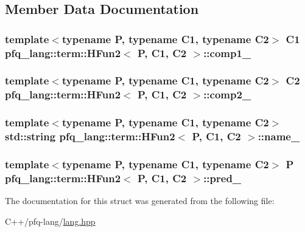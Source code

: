 \subsection{Member Data Documentation}
\hypertarget{structpfq__lang_1_1term_1_1HFun2_a7c395ee57e98d0991b54984ed3da65a8}{
\subsubsection[{comp1\-\_\-}]{\setlength{\rightskip}{0pt plus 5cm}template$<$typename P, typename C1, typename C2$>$ C1 {\bf pfq\-\_\-lang\-::term\-::\-H\-Fun2}$<$ P, C1, C2 $>$\-::comp1\-\_\-}}\label{structpfq__lang_1_1term_1_1HFun2_a7c395ee57e98d0991b54984ed3da65a8}
\hypertarget{structpfq__lang_1_1term_1_1HFun2_a9d891e5539b5140e3ba2c4a02c9ac1fb}{
\subsubsection[{comp2\-\_\-}]{\setlength{\rightskip}{0pt plus 5cm}template$<$typename P, typename C1, typename C2$>$ C2 {\bf pfq\-\_\-lang\-::term\-::\-H\-Fun2}$<$ P, C1, C2 $>$\-::comp2\-\_\-}}\label{structpfq__lang_1_1term_1_1HFun2_a9d891e5539b5140e3ba2c4a02c9ac1fb}
\hypertarget{structpfq__lang_1_1term_1_1HFun2_aa3808dccb93ad00cfd0be7caa80f30b9}{
\subsubsection[{name\-\_\-}]{\setlength{\rightskip}{0pt plus 5cm}template$<$typename P, typename C1, typename C2$>$ std\-::string {\bf pfq\-\_\-lang\-::term\-::\-H\-Fun2}$<$ P, C1, C2 $>$\-::name\-\_\-}}\label{structpfq__lang_1_1term_1_1HFun2_aa3808dccb93ad00cfd0be7caa80f30b9}
\hypertarget{structpfq__lang_1_1term_1_1HFun2_aa33f80727f25efed1112901cbcf1098a}{
\subsubsection[{pred\-\_\-}]{\setlength{\rightskip}{0pt plus 5cm}template$<$typename P, typename C1, typename C2$>$ P {\bf pfq\-\_\-lang\-::term\-::\-H\-Fun2}$<$ P, C1, C2 $>$\-::pred\-\_\-}}\label{structpfq__lang_1_1term_1_1HFun2_aa33f80727f25efed1112901cbcf1098a}


The documentation for this struct was generated from the following file\-:\begin{DoxyCompactItemize}
\item 
C++/pfq-\/lang/\hyperlink{lang_8hpp}{lang.\-hpp}\end{DoxyCompactItemize}
